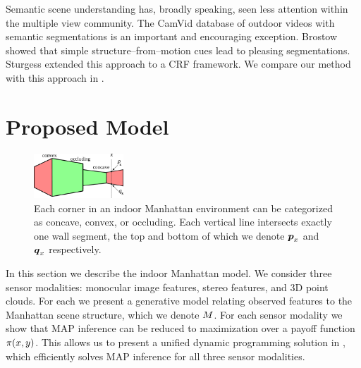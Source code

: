 Semantic scene understanding has, broadly speaking, seen less
attention within the multiple view community. The CamVid
\cite{Brostow08} database of outdoor videos with semantic
segmentations is an important and encouraging exception. Brostow \etal
\cite{Brostow08} showed that simple structure--from--motion cues lead
to pleasing segmentations. Sturgess \etal \cite{Sturgess09} extended
this approach to a CRF framework. We compare our method with this
approach in .



\section{Proposed Model}
\label{sect:model}

\begin{figure}[tb]%
  \centering
  \label{fig:corner-types}
  \includegraphics[width=0.3\textwidth]{figures/corner-types}
  \hspace{0.1cm}
  \caption{Each corner in an indoor Manhattan environment can be
    categorized as concave, convex, or occluding. Each vertical line
    intersects exactly one wall segment, the top and bottom of which
    we denote $\boldsymbol{p}_x$ and $\boldsymbol{q}_x$ respectively.}
\end{figure}

In this section we describe the indoor Manhattan model. We consider
three sensor modalities: monocular image features, stereo features,
and 3D point clouds. For each we present a generative model relating
observed features to the Manhattan scene structure, which we denote
$M$. For each sensor modality we show that MAP inference can be
reduced to maximization over a payoff function
$\pi(x,y)$. This allows us to present a unified dynamic
programming solution in , which efficiently solves
MAP inference for all three sensor modalities.

